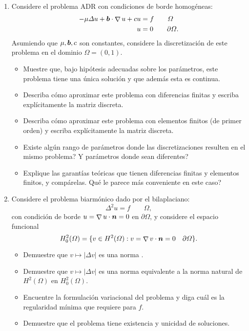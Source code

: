 \documentclass{article}
\renewcommand{\vec}{\vectorsym}
\DeclareMathOperator{\grad}{\nabla}
\begin{document}
\begin{enumerate}

    \item Considere el problema ADR con condiciones de borde homogéneas:
            $$ \begin{aligned}
                -\mu \Delta u + \vec b \cdot \grad u + c u &= f \qquad \Omega \\
                u &= 0 \qquad \partial\Omega.
            \end{aligned}$$
            Asumiendo que $\mu,\vec b,c$ son constantes, considere la discretización de este problema en el dominio $\Omega = (0,1)$. 
            \begin{itemize}
                \item Muestre que, bajo hipótesis adecuadas sobre los parámetros,  este problema tiene una única solución y que además esta es continua.
                \item Describa cómo aproximar este problema con diferencias finitas y escriba explícitamente la matriz discreta.
                \item Describa cómo aproximar este problema con elementos finitos (de primer orden) y escriba explícitamente la matriz discreta. 
                \item Existe algún rango de parámetros donde las discretizaciones resulten en el mismo problema? Y parámetros donde sean diferentes? 
                \item Explique las garantías teóricas que tienen diferencias finitas y elementos finitos, y compárelas. Qué le parece más conveniente en este caso? 
            \end{itemize}

    \item Considere el problema biarmónico dado por el bilaplaciano:
            $$ \Delta^2 u = f \qquad \Omega, $$
            con condición de borde $u = \grad u\cdot \vec n = 0$ en $\partial\Omega$, y considere el espacio funcional 
                $$ H_0^2(\Omega) = \{v \in H^2(\Omega): v=\grad v \cdot \vec n = 0 \quad \partial\Omega\}. $$
            \begin{itemize}
                \item Demuestre que $v\mapsto|\Delta v|$ es una norma .
                \item Demuestre que $v\mapsto|\Delta v|$ es una norma equivalente a la norma natural de $H^2(\Omega)$ en $H_0^2(\Omega)$.
                \item Encuentre la formulación variacional del problema y diga cuál es la regularidad mínima que requiere para $f$. 
                \item Demuestre que el problema tiene existencia y unicidad de soluciones. 
            \end{itemize}
        

\end{enumerate}
\end{document}
